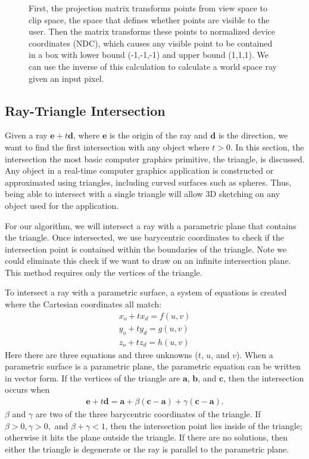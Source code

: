 \begin{figure}
\label{fig:projmatrix}
\caption[Clip space and NDC space]{First, the projection matrix transforms points from view space to clip space, the space that defines whether points are visible to the user. Then the matrix transforms these points to normalized device coordinates (NDC), which causes any visible point to be contained in a box with lower bound (-1,-1,-1) and upper bound (1,1,1). We can use the inverse of this calculation to calculate a world space ray given an input pixel.}
\end{figure}


\subsection{Ray-Triangle Intersection}

Given a ray $\mathbf{e} + t\mathbf{d}$, where $\mathbf{e}$ is the origin of the ray and $\mathbf{d}$ is the direction, we want to find the first intersection with any object where $t > 0$.
In this section, the intersection the most basic computer graphics primitive, the triangle, is discussed.
Any object in a real-time computer graphics application is constructed or approximated using triangles, including curved surfaces such as spheres.
Thus, being able to intersect with a single triangle will allow 3D sketching on any object used for the application.

For our algorithm, we will intersect a ray with a parametric plane that contains the triangle.
Once intersected, we use barycentric coordinates to check if the intersection point is contained within the boundaries of the triangle. 
Note we could eliminate this check if we want to draw on an infinite intersection plane.
This method requires only the vertices of the triangle.

To intersect a ray with a parametric surface, a system of equations is created where the Cartesian coordinates all match:
\begin{align}
x_o + tx_d = f(u,v) \\
y_o + ty_d = g(u,v) \\
z_o + tz_d = h(u,v)
\end{align}
Here there are three equations and three unknowns ($t$, $u$, and $v$).
When a parametric surface is a parametric plane, the parametric equation can be written in vector form.
If the vertices of the triangle are $\mathbf{a}$, $\mathbf{b}$, and $\mathbf{c}$, then the intersection occurs when
\begin{align}
\mathbf{e} + t\mathbf{d} = \mathbf{a} + \beta(\mathbf{c}-\mathbf{a}) + \gamma(\mathbf{c}-\mathbf{a}).
\end{align}
$\beta$ and $\gamma$ are two of the three barycentric coordinates of the triangle. 
If $\beta > 0, \gamma > 0,$ and $\beta + \gamma < 1$, then the intersection point lies inside of the triangle; otherwise it hits the plane outside the triangle.
If there are no solutions, then either the triangle is degenerate or the ray is parallel to the parametric plane.


